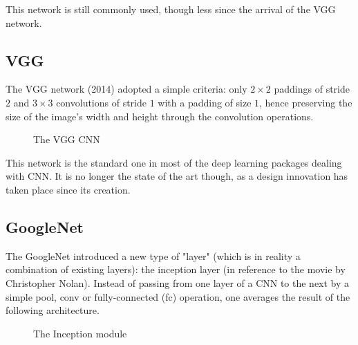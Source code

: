 This network is still commonly used, though less since the arrival of the VGG network.

\subsection{VGG}

The VGG\cite{DBLP:journals/corr/SimonyanZ14a} network (2014) adopted a simple criteria: only $2 \times 2$ paddings of stride $2$ and $3\times 3$ convolutions of stride $1$ with a padding of size $1$, hence preserving the size of the image's width and height through the convolution operations.

\begin{figure}[H]
\begin{center}
\caption{The VGG CNN}
\end{center}
\end{figure}

This network is the standard one in most of the deep learning packages dealing with CNN. It is no longer the state of the art though, as a design innovation has taken place since its creation. 

\subsection{GoogleNet}

The GoogleNet\cite{43022} introduced a new type of "layer" (which is in reality a combination of existing layers): the inception layer (in reference to the movie by Christopher Nolan). Instead of passing from one layer of a CNN to the next by a simple pool, conv or fully-connected (fc) operation, one averages the result of the following architecture.

\begin{figure}[H]
\begin{center}
\caption{The Inception module}
\end{center}
\end{figure}

